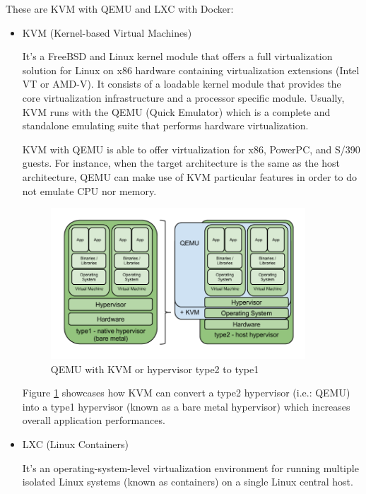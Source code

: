 These are KVM with QEMU and LXC with Docker:

\begin{itemize}
\item KVM (Kernel-based Virtual Machines) \hfill

It's a FreeBSD and Linux kernel module that offers a full virtualization solution for Linux on x86 hardware containing virtualization extensions (Intel VT or AMD-V). It consists of a loadable kernel module that provides the core virtualization infrastructure and a processor specific module.
Usually, KVM runs with the QEMU (Quick Emulator) which is a complete and standalone emulating suite that performs hardware virtualization.

KVM with QEMU is able to offer virtualization for x86, PowerPC, and S/390 guests. For instance, when the target architecture is the same as the host architecture, QEMU can make use of KVM particular features in order to do not emulate CPU nor memory.

\begin{figure}[!htb]
\begin{center}
\includegraphics[width=0.9\textwidth]{./images/KVM.png}
\caption{QEMU with KVM or hypervisor type2 to type1}
\label{F:KVMandQEMU}
\end{center}
\end{figure}

Figure \ref{F:KVMandQEMU} showcases how KVM can convert a type2 hypervisor (i.e.: QEMU) into a type1 hypervisor (known as a bare metal hypervisor) which increases overall application performances. 

\item LXC (Linux Containers) \hfill

It's an operating-system-level virtualization environment for running multiple isolated Linux systems (known as containers) on a single Linux central host.


\end{itemize}
